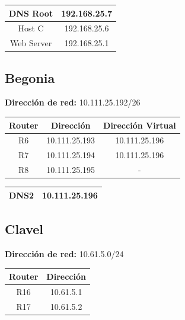 \begin{table}[!htbp]
\centering
  \begin{tabular}{|c|c|}
    \hline
	DNS Root & 192.168.25.7 \\ \hline
	Host C & 192.168.25.6 \\ \hline
	Web Server & 192.168.25.1 \\
    \hline
  \end{tabular}
\end{table}

\subsection{Begonia}

\textbf{Dirección de red:} 10.111.25.192/26

\begin{table}[!htbp]
\centering
  \begin{tabular}{|c|c|c|}
    \hline
	Router & Dirección & Dirección Virtual\\ \hline
	R6 & 10.111.25.193 & 10.111.25.196 \\ \hline
	R7 & 10.111.25.194 & 10.111.25.196  \\ \hline
	R8 & 10.111.25.195 & - \\
    \hline
  \end{tabular}
\end{table}

\begin{table}[!htbp]
\centering
  \begin{tabular}{|c|c|}
    \hline
	DNS2& 10.111.25.196 \\
    \hline
  \end{tabular}
\end{table}

\subsection{Clavel}
\textbf{Dirección de red:} 10.61.5.0/24
\begin{table}[!htbp]
\centering
  \begin{tabular}{|c|c|}
    \hline
	Router & Dirección\\ \hline
	R16 & 10.61.5.1 \\ \hline
	R17 & 10.61.5.2 \\
    \hline
  \end{tabular}
\end{table}

